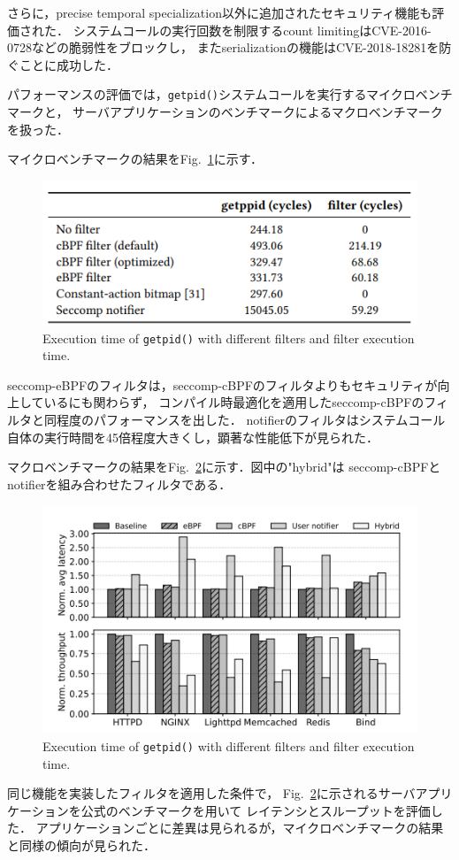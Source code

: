 \documentclass[platex,a4j,10pt,twoside,twocolumn,dvipdfmx]{jsarticle}
\newcommand{\Fref}[1]{Fig.~\ref{#1}}
\begin{document}
さらに，precise temporal specialization以外に追加されたセキュリティ機能も評価された．
システムコールの実行回数を制限するcount limitingはCVE-2016-0728などの脆弱性をブロックし，
またserializationの機能はCVE-2018-18281を防ぐことに成功した．

パフォーマンスの評価では，\texttt{getpid()}システムコールを実行するマイクロベンチマークと，
サーバアプリケーションのベンチマークによるマクロベンチマークを扱った．

マイクロベンチマークの結果を\Fref{img:micro-bench}に示す．
\begin{figure}[tp]
  \begin{center}
    \includegraphics[width=\columnwidth]{./img/micro-bench.png}
  \end{center}
  \caption{Execution time of \texttt{getpid()} with different filters and filter execution time.}
  \label{img:micro-bench}
\end{figure}
seccomp-eBPFのフィルタは，seccomp-cBPFのフィルタよりもセキュリティが向上しているにも関わらず，
コンパイル時最適化を適用したseccomp-cBPFのフィルタと同程度のパフォーマンスを出した．
notifierのフィルタはシステムコール自体の実行時間を45倍程度大きくし，顕著な性能低下が見られた．

マクロベンチマークの結果を\Fref{img:macro-bench}に示す．図中の"hybrid"は
seccomp-cBPFとnotifierを組み合わせたフィルタである．
\begin{figure}[tp]
  \begin{center}
    \includegraphics[width=\columnwidth]{./img/macro-bench.png}
  \end{center}
  \caption{Execution time of \texttt{getpid()} with different filters and filter execution time.}
  \label{img:macro-bench}
\end{figure}
同じ機能を実装したフィルタを適用した条件で，
\Fref{img:macro-bench}に示されるサーバアプリケーションを公式のベンチマークを用いて
レイテンシとスループットを評価した．
アプリケーションごとに差異は見られるが，マイクロベンチマークの結果と同様の傾向が見られた．
\end{document}
